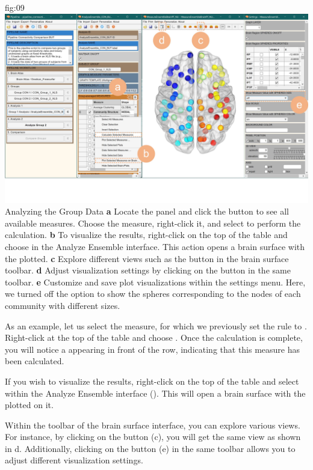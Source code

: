 \documentclass[justified]{tufte-handout}
\begin{document}
	{fig:09}
	{
	\includegraphics{fig09.jpg}
	}
	{Analyzing the Group Data}
	{
	{\bf a} Locate the  panel and click the  button to see all available measures. Choose the  measure, right-click it, and select  to perform the calculation.
	{\bf b} To visualize the results, right-click on the top of the table and choose  in the Analyze Ensemble interface. This action opens a brain surface with the  plotted.
	{\bf c} Explore different views such as the  button in the brain surface toolbar.
	{\bf d} Adjust visualization settings by clicking on the  button in the same toolbar.
	{\bf e} Customize and save plot visualizations within the settings menu. Here, we turned off the option to show the spheres corresponding to the nodes of each community with different sizes.
	}

As an example, let us select the  measure, for which we previously set the rule to . Right-click at the top of the table and choose . Once the calculation is complete, you will notice a  appearing in front of the  row, indicating that this measure has been calculated.

If you wish to visualize the results, right-click on the top of the table and select  within the Analyze Ensemble interface (). This will open a brain surface with the  plotted on it.

Within the toolbar of the brain surface interface, you can explore various views.
For instance, by clicking on the  button (c), you will get the same view as shown in d. Additionally, clicking on the  button (e) in the same toolbar allows you to adjust different visualization settings.
\end{document}
